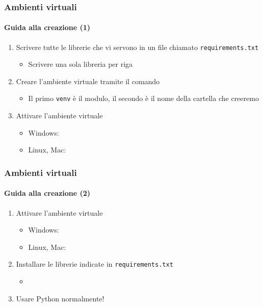 \begin{exampleframe}
    \frametitle{Ambienti virtuali}
    \framesubtitle{Guida alla creazione (1)}

    \begin{enumerate}
        \item Scrivere tutte le librerie che vi servono in un file chiamato \texttt{requirements.txt}
        \begin{itemize}
            \item Scrivere una sola libreria per riga
        \end{itemize}

        \bigskip
        \item Creare l'ambiente virtuale tramite il comando 
        \begin{itemize}
            \item Il primo \texttt{venv} è il modulo, il secondo è il nome della cartella che creeremo
        \end{itemize}
        
        \bigskip
        \item Attivare l'ambiente virtuale
        \begin{itemize}
            \item Windows: 
            \item Linux, Mac: 
        \end{itemize}
    \end{enumerate}
\end{exampleframe}

\begin{exampleframe}
    \frametitle{Ambienti virtuali}
    \framesubtitle{Guida alla creazione (2)}

    \begin{enumerate}
        \item Attivare l'ambiente virtuale
        \begin{itemize}
            \item Windows: 
            \item Linux, Mac: 
        \end{itemize}

        \bigskip
        \item Installare le librerie indicate in \texttt{requirements.txt}
        \begin{itemize}
            \item {}
        \end{itemize}

        \bigskip
        \item Usare Python normalmente!
    \end{enumerate}
\end{exampleframe}

